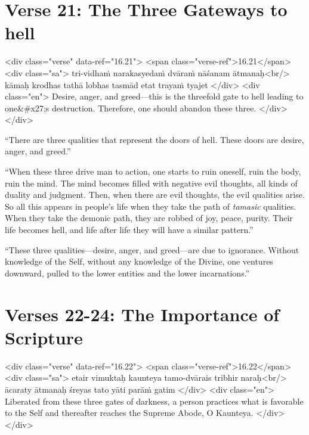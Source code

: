 \section{Verse 21: The Three Gateways to hell}\label{sec-verse-21-the-three-gateways-to-hell}


\begin{html}
<div class="verse" data-ref="16.21">
  <span class="verse-ref">16.21</span>
  <div class="sa">
    tri-vidhaṁ narakasyedaṁ dvāraṁ nāśanam ātmanaḥ<br/>
    kāmaḥ krodhas tathā lobhas tasmād etat trayaṁ tyajet
  </div>
  <div class="en">
    Desire, anger, and greed---this is the threefold gate to hell leading to one&#x27;s destruction. Therefore, one should abandon these three.
  </div>
</div>
\end{html}


\enquote{There are three qualities that represent the doors of hell. These doors are desire, anger, and greed.}

\enquote{When these three drive man to action, one starts to ruin oneself, ruin the body, ruin the mind. The mind becomes filled with negative evil thoughts, all kinds of duality and judgment. Then, when there are evil thoughts, the evil qualities arise. So all this appears in people’s life when they take the path of \textit{tamasic} qualities. When they take the demonic path, they are robbed of joy, peace, purity. Their life becomes hell, and life after life they will have a similar pattern.}

\enquote{These three qualities---desire, anger, and greed---are due to ignorance. Without knowledge of the Self, without any knowledge of the Divine, one ventures downward, pulled to the lower entities and the lower incarnations.}

\section{Verses 22-24: The Importance of Scripture}\label{sec-verses-22-24-the-importance-of-scripture}


\begin{html}
<div class="verse" data-ref="16.22">
  <span class="verse-ref">16.22</span>
  <div class="sa">
    etair vimuktaḥ kaunteya tamo-dvārais tribhir naraḥ<br/>
    ācaraty ātmanaḥ śreyas tato yāti parāṁ gatim
  </div>
  <div class="en">
    Liberated from these three gates of darkness, a person practices what is favorable to the Self and thereafter reaches the Supreme Abode, O Kaunteya.
  </div>
</div>
\end{html}



